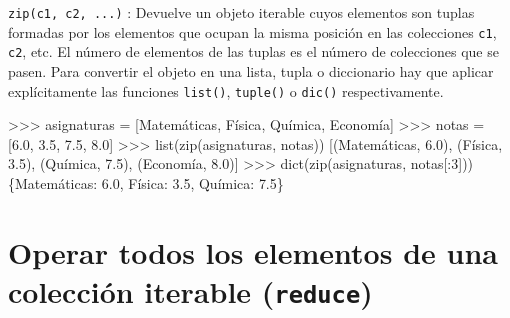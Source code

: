 \documentclass[
  spanish,
  a4paper,
]{scrreport}
\newenvironment{Shaded}{\begin{snugshade}}{\end{snugshade}}
\newcommand{\BuiltInTok}[1]{\textcolor[rgb]{0.00,0.23,0.31}{#1}}
\newcommand{\DecValTok}[1]{\textcolor[rgb]{0.68,0.00,0.00}{#1}}
\newcommand{\FloatTok}[1]{\textcolor[rgb]{0.68,0.00,0.00}{#1}}
\newcommand{\NormalTok}[1]{\textcolor[rgb]{0.00,0.23,0.31}{#1}}
\newcommand{\OperatorTok}[1]{\textcolor[rgb]{0.37,0.37,0.37}{#1}}
\newcommand{\StringTok}[1]{\textcolor[rgb]{0.13,0.47,0.30}{#1}}
\begin{document}
\texttt{zip(c1,\ c2,\ ...)} : Devuelve un objeto iterable cuyos
elementos son tuplas formadas por los elementos que ocupan la misma
posición en las colecciones \texttt{c1}, \texttt{c2}, etc. El número de
elementos de las tuplas es el número de colecciones que se pasen. Para
convertir el objeto en una lista, tupla o diccionario hay que aplicar
explícitamente las funciones \texttt{list()}, \texttt{tuple()} o
\texttt{dic()} respectivamente.

\begin{Shaded}
\begin{Highlighting}[]
\OperatorTok{\textgreater{}\textgreater{}\textgreater{}}\NormalTok{ asignaturas }\OperatorTok{=}\NormalTok{ [}\StringTok{\textquotesingle{}Matemáticas\textquotesingle{}}\NormalTok{, }\StringTok{\textquotesingle{}Física\textquotesingle{}}\NormalTok{, }\StringTok{\textquotesingle{}Química\textquotesingle{}}\NormalTok{, }\StringTok{\textquotesingle{}Economía\textquotesingle{}}\NormalTok{]}
\OperatorTok{\textgreater{}\textgreater{}\textgreater{}}\NormalTok{ notas }\OperatorTok{=}\NormalTok{ [}\FloatTok{6.0}\NormalTok{, }\FloatTok{3.5}\NormalTok{, }\FloatTok{7.5}\NormalTok{, }\FloatTok{8.0}\NormalTok{]}
\OperatorTok{\textgreater{}\textgreater{}\textgreater{}} \BuiltInTok{list}\NormalTok{(}\BuiltInTok{zip}\NormalTok{(asignaturas, notas))}
\NormalTok{[(}\StringTok{\textquotesingle{}Matemáticas\textquotesingle{}}\NormalTok{, }\FloatTok{6.0}\NormalTok{), (}\StringTok{\textquotesingle{}Física\textquotesingle{}}\NormalTok{, }\FloatTok{3.5}\NormalTok{), (}\StringTok{\textquotesingle{}Química\textquotesingle{}}\NormalTok{, }\FloatTok{7.5}\NormalTok{), (}\StringTok{\textquotesingle{}Economía\textquotesingle{}}\NormalTok{, }\FloatTok{8.0}\NormalTok{)]}
\OperatorTok{\textgreater{}\textgreater{}\textgreater{}} \BuiltInTok{dict}\NormalTok{(}\BuiltInTok{zip}\NormalTok{(asignaturas, notas[:}\DecValTok{3}\NormalTok{]))}
\NormalTok{\{}\StringTok{\textquotesingle{}Matemáticas\textquotesingle{}}\NormalTok{: }\FloatTok{6.0}\NormalTok{, }\StringTok{\textquotesingle{}Física\textquotesingle{}}\NormalTok{: }\FloatTok{3.5}\NormalTok{, }\StringTok{\textquotesingle{}Química\textquotesingle{}}\NormalTok{: }\FloatTok{7.5}\NormalTok{\}}
\end{Highlighting}
\end{Shaded}

\section{\texorpdfstring{Operar todos los elementos de una colección
iterable
(\texttt{reduce})}{Operar todos los elementos de una colección iterable (reduce)}}\label{operar-todos-los-elementos-de-una-colecciuxf3n-iterable-reduce}
\end{document}
